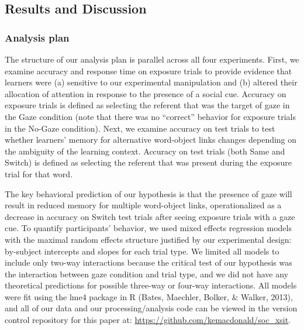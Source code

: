 \documentclass[authoryear, review]{elsarticle}
\begin{document}
\subsection{Results and Discussion}\label{results-and-discussion}

\subsubsection{Analysis plan}\label{analysis-plan}

The structure of our analysis plan is parallel across all four
experiments. First, we examine accuracy and response time on exposure
trials to provide evidence that learners were (a) sensitive to our
experimental manipulation and (b) altered their allocation of attention
in response to the presence of a social cue. Accuracy on exposure trials
is defined as selecting the referent that was the target of gaze in the
Gaze condition (note that there was no ``correct'' behavior for exposure
trials in the No-Gaze condition). Next, we examine accuracy on test
trials to test whether learners' memory for alternative word-object
links changes depending on the ambiguity of the learning context.
Accuracy on test trials (both Same and Switch) is defined as selecting
the referent that was present during the exposure trial for that word.

The key behavioral prediction of our hypothesis is that the presence of
gaze will result in reduced memory for multiple word-object links,
operationalized as a decrease in accuracy on Switch test trials after
seeing exposure trials with a gaze cue. To quantify participants'
behavior, we used mixed effects regression models with the maximal
random effects structure justified by our experimental design:
by-subject intercepts and slopes for each trial type. We limited all
models to include only two-way interactions because the critical test of
our hypothesis was the interaction between gaze condition and trial
type, and we did not have any theoretical predictions for possible
three-way or four-way interactions. All models were fit using the lme4
package in R (Bates, Maechler, Bolker, \& Walker, 2013), and all of our
data and our processing/analysis code can be viewed in the version
control repository for this paper at:
\url{https://github.com/kemacdonald/soc_xsit}.
\end{document}
